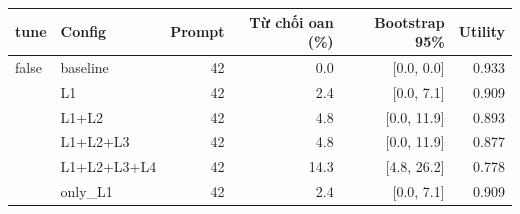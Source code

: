 \begin{tabular}{llrrrr}
\toprule
tune & Config & Prompt & Từ chối oan (\%) & Bootstrap 95\% & Utility \\
\midrule
false & baseline & 42 & 0.0 & [0.0, 0.0] & 0.933 \\
 & L1 & 42 & 2.4 & [0.0, 7.1] & 0.909 \\
 & L1+L2 & 42 & 4.8 & [0.0, 11.9] & 0.893 \\
 & L1+L2+L3 & 42 & 4.8 & [0.0, 11.9] & 0.877 \\
 & L1+L2+L3+L4 & 42 & 14.3 & [4.8, 26.2] & 0.778 \\
 & only\_L1 & 42 & 2.4 & [0.0, 7.1] & 0.909 \\
\bottomrule
\end{tabular}
